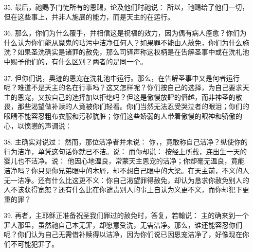 35. 最后，祂赐予门徒所有的恩赐，论及他们时祂说： 所以，祂赐给了他们一切，但在这些事上，并非人施展的能力，而是天主的在运行。\par

36. 那么，你们为什么覆手，并相信这是祝福的效力，因为偶有病人痊愈？你们为什么认为你们能从魔鬼的玷污中洁净任何人？如果罪不能由人赦免，你们为什么施洗？如果圣洗确实是诸罪的赦免，那么司铎声称这权柄是在告解圣事中或在洗礼池中赐予他们的，有什么区别？两者的是同一个。\par

37. 但你们说，奥迹的恩宠在洗礼池中运行。那么，在告解圣事中又是何者运行呢？难道不是天主的名在行事吗？这又怎样呢？你们按自己的选择，为自己要求天主的恩宠，又按自己的选择加以拒绝吗？但这是傲慢放肆的僭越，而非神圣的敬畏，那些渴望做补赎的人竟被你们轻看。你们当然无法忍受哭泣者的眼泪；你们的眼睛不能容忍粗布衣服和污秽肮脏；你们这些娇弱的人带着傲慢的眼神和骄傲的心，以愤懑的声调说：\par

38. 主确实对说过： 然而，那位洁净者并未说： 你，，竟敢称自己洁净？纵使你的行为洁净，单凭这句话你就已不洁。说： 而你却说： 按经上所载，连出生一天的婴儿也不洁净。说： 他因心地温良，常蒙天主恩宠的洁净；你却毫无温良，竟能洁净吗？你只见你兄弟眼中的木屑，却不想自己眼中的大梁。在天主前，不义的人无一洁净。还有什么比这更不义：你自己渴望罪得赦免，却认为恳求你赦免别人的人不该获得宽恕？还有什么比在你谴责别人的事上自认为义更不义，而你却犯下更重的罪？\par

39. 再者，主耶稣正准备祝圣我们罪过的赦免时，答复，若翰说： 主的确来到一个罪人那里，虽然祂自己本无罪，却愿意受洗，无需洁净。那么，谁还能容忍你们呢？你们认为自己无需借补赎得以洁净，因为你们说已因恩宠洁净了，好像现在你们不可能犯罪了。\par


